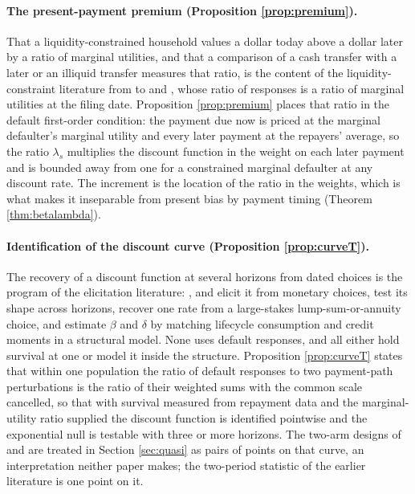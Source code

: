 \paragraph{The present-payment premium (Proposition \ref{prop:premium}).} That a liquidity-constrained household values a dollar today above a dollar later by a ratio of marginal utilities, and that a comparison of a cash transfer with a later or an illiquid transfer measures that ratio, is the content of the liquidity-constraint literature from \citet{zeldes_consumption_1989} to \citet{chetty_moral_2008} and \citet{indarte_moral_2023}, whose ratio of responses is a ratio of marginal utilities at the filing date. Proposition \ref{prop:premium} places that ratio in the default first-order condition: the payment due now is priced at the marginal defaulter's marginal utility and every later payment at the repayers' average, so the ratio $\lambda_s$ multiplies the discount function in the weight on each later payment and is bounded away from one for a constrained marginal defaulter at any discount rate. The increment is the location of the ratio in the weights, which is what makes it inseparable from present bias by payment timing (Theorem \ref{thm:betalambda}).

\paragraph{Identification of the discount curve (Proposition \ref{prop:curveT}).} The recovery of a discount function at several horizons from dated choices is the program of the elicitation literature: \citet{coller_eliciting_1999}, \citet{harrison_estimating_2002} and \citet{andreoni_estimating_2012} elicit it from monetary choices, \citet{benhabib_present-bias_2010} test its shape across horizons, \citet{warner_personal_2001} recover one rate from a large-stakes lump-sum-or-annuity choice, and \citet{laibson_estimating_2024} estimate $\beta$ and $\delta$ by matching lifecycle consumption and credit moments in a structural model. None uses default responses, and all either hold survival at one or model it inside the structure. Proposition \ref{prop:curveT} states that within one population the ratio of default responses to two payment-path perturbations is the ratio of their weighted sums with the common scale cancelled, so that with survival measured from repayment data and the marginal-utility ratio supplied the discount function is identified pointwise and the exponential null is testable with three or more horizons. The two-arm designs of \citet{ganong_liquidity_2020} and \citet{dobbie_targeted_2020} are treated in Section \ref{sec:quasi} as pairs of points on that curve, an interpretation neither paper makes; the two-period statistic of the earlier literature is one point on it.

